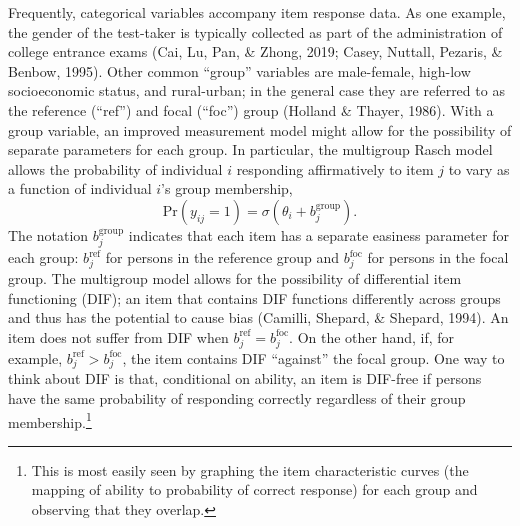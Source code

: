 \documentclass[
  english,
  man,floatsintext]{apa6}
\begin{document}
Frequently, categorical variables accompany item response data. As one example, the gender of the test-taker is typically collected as part of the administration of college entrance exams (Cai, Lu, Pan, \& Zhong, 2019; Casey, Nuttall, Pezaris, \& Benbow, 1995). Other common ``group'' variables are male-female, high-low socioeconomic status, and rural-urban; in the general case they are referred to as the reference (``ref'') and focal (``foc'') group (Holland \& Thayer, 1986). With a group variable, an improved measurement model might allow for the possibility of separate parameters for each group. In particular, the multigroup Rasch model allows the probability of individual \(i\) responding affirmatively to item \(j\) to vary as a function of individual \(i\)'s group membership,
\begin{equation}
\label{eq:rasch}
\text{Pr}(y_{ij} = 1) = \sigma(\theta_{i} + b_j^\text{group}).
\end{equation}
The notation \(b_j^{\text{group}}\) indicates that each item has a separate easiness parameter for each group: \(b_j^{\text{ref}}\) for persons in the reference group and \(b_j^{\text{foc}}\) for persons in the focal group. The multigroup model allows for the possibility of differential item functioning (DIF); an item that contains DIF functions differently across groups and thus has the potential to cause bias (Camilli, Shepard, \& Shepard, 1994). An item does not suffer from DIF when \(b_j^{\text{ref}} = b_j^{\text{foc}}\). On the other hand, if, for example, \(b_j^{\text{ref}} > b_j^{\text{foc}}\), the item contains DIF ``against'' the focal group. One way to think about DIF is that, conditional on ability, an item is DIF-free if persons have the same probability of responding correctly regardless of their group membership.\footnote{This is most easily seen by graphing the item characteristic curves (the mapping of ability to probability of correct response) for each group and observing that they overlap.}
\end{document}
